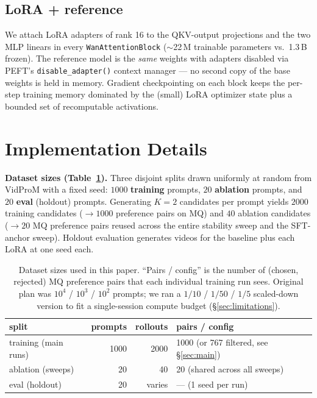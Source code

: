 \documentclass{article}
\begin{document}
\subsection{LoRA + reference}
We attach LoRA adapters of rank 16 to the QKV-output projections and the two MLP linears in every \texttt{WanAttentionBlock} ($\sim$22\,M trainable parameters vs.\ 1.3\,B frozen).  The reference model is the \emph{same} weights with adapters disabled via PEFT's \texttt{disable\_adapter()} context manager --- no second copy of the base weights is held in memory.  Gradient checkpointing on each block keeps the per-step training memory dominated by the (small) LoRA optimizer state plus a bounded set of recomputable activations.

\section{Implementation Details}
\label{sec:impl}

\textbf{Dataset sizes (Table~\ref{tab:datasizes}).}  Three disjoint splits drawn uniformly at random from VidProM with a fixed seed: $1000$ \textbf{training} prompts, $20$ \textbf{ablation} prompts, and $20$ \textbf{eval} (holdout) prompts.  Generating $K{=}2$ candidates per prompt yields $2000$ training candidates ($\to 1000$ preference pairs on MQ) and $40$ ablation candidates ($\to 20$ MQ preference pairs reused across the entire stability sweep and the SFT-anchor sweep).  Holdout evaluation generates videos for the baseline plus each LoRA at one seed each.

\begin{table}[h]
\centering
\caption{Dataset sizes used in this paper.  ``Pairs / config'' is the number of (chosen, rejected) MQ preference pairs that each individual training run sees.  Original plan was $10^4$ / $10^3$ / $10^2$ prompts; we ran a $1/10$ / $1/50$ / $1/5$ scaled-down version to fit a single-session compute budget (\S\ref{sec:limitations}).}
\label{tab:datasizes}
\begin{tabular}{@{}lrrl@{}}
\toprule
split & prompts & rollouts & pairs / config \\
\midrule
training (main runs)        & 1000 & 2000 & 1000 (or 767 filtered, see \S\ref{sec:main}) \\
ablation (sweeps)           & 20   & 40   & 20 (shared across all sweeps) \\
eval (holdout)              & 20   & varies & --- (1 seed per run) \\
\bottomrule
\end{tabular}
\end{table}
\end{document}
